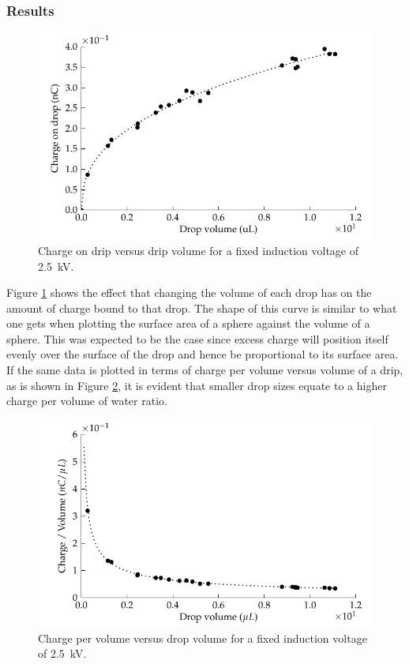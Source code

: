 \subsubsection*{Results}

\begin{figure}
    \centering
    \includegraphics{content/appendices/chargedWaterDrops/graphics/dripper_chargeVsVolume}
    \caption{\label{Graph_dripperExperiment_chargeVsVolume}Charge on drip versus drip volume for a fixed induction voltage of \SI{2.5}{\kilo\volt}.}
\end{figure}
Figure \ref{Graph_dripperExperiment_chargeVsVolume} shows the effect
that changing the volume of each drop has on the amount of charge
bound to that drop. The shape of this curve is similar to what one
gets when plotting the surface area of a sphere against the volume
of a sphere. This was expected to be the case since excess charge
will position itself evenly over the surface of the drop and hence
be proportional to its surface area. If the same data is plotted in
terms of charge per volume versus volume of a drip, as is shown in
Figure \ref{Figure_Graph_dripper_chargePerVolumeVsVolume}, it is
evident that smaller drop sizes equate to a higher charge per volume
of water ratio.

\begin{figure}
    \centering
    \includegraphics{content/appendices/chargedWaterDrops/graphics/dripper_chargePerVolumeVsVolume}
    \caption{\label{Figure_Graph_dripper_chargePerVolumeVsVolume}Charge per volume
    versus drop volume for a fixed induction voltage of \SI{2.5}{\kilo\volt}.}
\end{figure}


